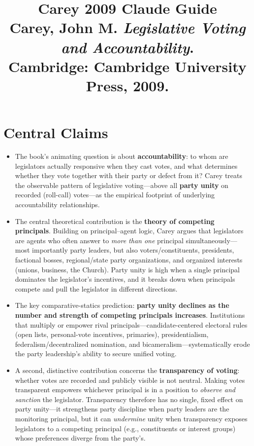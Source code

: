 \documentclass[12pt]{article}
\title{\textbf{Carey 2009 Claude Guide}\\
\large Carey, John M. \textit{Legislative Voting and Accountability}.\\
Cambridge: Cambridge University Press, 2009.}
\author{}
\date{}
\begin{document}
\maketitle
\tableofcontents
\newpage

\section{Central Claims}

\begin{itemize}[leftmargin=*, itemsep=4pt]
    \item The book's animating question is about \textbf{accountability}: to whom are legislators actually responsive when they cast votes, and what determines whether they vote together with their party or defect from it? Carey treats the observable pattern of legislative voting---above all \textbf{party unity} on recorded (roll-call) votes---as the empirical footprint of underlying accountability relationships.
    \item The central theoretical contribution is the \textbf{theory of competing principals}. Building on principal--agent logic, Carey argues that legislators are agents who often answer to \emph{more than one} principal simultaneously---most importantly party leaders, but also voters/constituents, presidents, factional bosses, regional/state party organizations, and organized interests (unions, business, the Church). Party unity is high when a single principal dominates the legislator's incentives, and it breaks down when principals compete and pull the legislator in different directions.
    \item The key comparative-statics prediction: \textbf{party unity declines as the number and strength of competing principals increases}. Institutions that multiply or empower rival principals---candidate-centered electoral rules (open lists, personal-vote incentives, primaries), presidentialism, federalism/decentralized nomination, and bicameralism---systematically erode the party leadership's ability to secure unified voting.
    \item A second, distinctive contribution concerns the \textbf{transparency of voting}: whether votes are recorded and publicly visible is not neutral. Making votes transparent empowers whichever principal is in a position to \emph{observe and sanction} the legislator. Transparency therefore has no single, fixed effect on party unity---it strengthens party discipline when party leaders are the monitoring principal, but it can \emph{undermine} unity when transparency exposes legislators to a competing principal (e.g., constituents or interest groups) whose preferences diverge from the party's.

\end{itemize}
\end{document}
